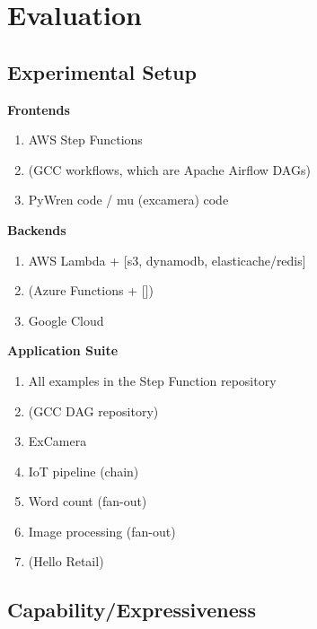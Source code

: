 \section{Evaluation}\label{sec:eval}

\subsection{Experimental Setup}

\textbf{Frontends}

\begin{enumerate}

	\item AWS Step Functions

	\item (GCC workflows, which are Apache Airflow DAGs)

	\item PyWren code / mu (excamera) code

\end{enumerate}

\textbf{Backends}

\begin{enumerate}

	\item AWS Lambda + [s3, dynamodb, elasticache/redis]

	\item (Azure Functions + [])

	\item Google Cloud

\end{enumerate}

\textbf{Application Suite}

\begin{enumerate}
	\item All examples in the Step Function repository
	\item (GCC DAG repository)
	\item ExCamera
	\item IoT pipeline (chain)
	\item Word count (fan-out)
	\item Image processing (fan-out)
	\item (Hello Retail)
\end{enumerate}


\subsection{Capability/Expressiveness}

